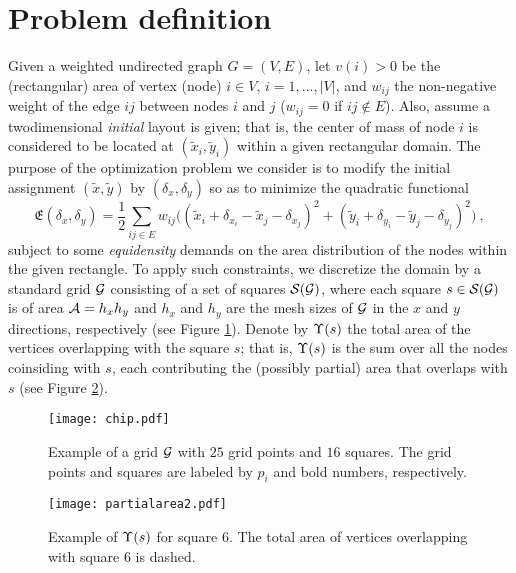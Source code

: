 \documentclass[final]{siamltex}
\begin{document}
\section{Problem definition}\label{prob-def}
\par Given a weighted undirected graph $G=(V, E)$, let $v(i)>0$ be the (rectangular)
area of vertex (node) $i\in V$, $i=1,...,|V|$,
and $w_{ij}$ the non-negative weight of the edge $ij$ between
nodes $i$ and $j$ ($w_{ij}=0$ if $ij\notin E$). Also, assume a twodimensional {\it initial} layout is given; that is, the center of
mass of node $i$ is considered to be located at $(\tilde{x}_i,
\tilde{y}_i)$ within a given rectangular domain. The purpose of
the optimization problem we consider is to modify the initial
assignment $(\tilde{x}, \tilde{y})$ by $(\delta_{x}, \delta_{y})$
so as to minimize the quadratic functional
\begin{equation}\label{first-probform}
\mathfrak{E}(\delta_{x}, \delta_{y}) = \frac{1}{2}\sum_{ij\in E}
w_{ij}\big(
(\tilde{x}_i+\delta_{x_i}-\tilde{x}_j-\delta_{x_j})^2+(\tilde{y}_i+\delta_{y_i}-\tilde{y}_j-\delta_{y_j})^2\big)
~,
\end{equation}
subject to some {\it equidensity} demands on the area distribution
of the nodes within the given rectangle. To apply such
constraints, we discretize the domain by a standard grid $\mathcal{G}$
consisting of a set of squares $\mathcal{S}(\mathcal{G})$, where each square $s\in
\mathcal{S}(\mathcal{G})$ is of area $\mathcal{A} = h_x h_y$ and $h_x$ and $h_y$ are the mesh
sizes of $\mathcal{G}$ in the $x$ and $y$ directions, respectively (see
Figure \ref{chipgrid}). Denote by $\Upsilon(s)$ the total area of the
vertices overlapping with the square $s$; that is, $\Upsilon(s)$ is
the sum over all the nodes coinsiding with $s$, each contributing
the (possibly partial) area that overlaps with $s$ (see Figure
\ref{partarea2}).
\begin{figure}[h]
\vbox{\center\texttt{[image: chip.pdf]}}
\caption{Example of a grid $\mathcal{G}$ with $25$ grid points and $16$
squares.
The grid points and squares are labeled by $p_i$ and bold numbers,
respectively.}\label{chipgrid}
\end{figure}
\begin{figure}[h]
\vbox{\center\texttt{[image: partialarea2.pdf]}}
\caption{Example of $\Upsilon(s)$ for square 6. The total area of vertices
overlapping with square 6 is dashed.} \label{partarea2}
\end{figure}
\end{document}
